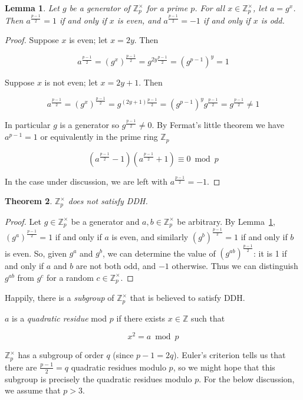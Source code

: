 \documentclass[11pt,twoside,a4paper]{article}
\newtheorem{theorem}{Theorem}[section]
\newtheorem{lemma}[theorem]{Lemma}
\theoremstyle{definition}
\begin{document}
\begin{lemma}\label{lem-parity}
    Let $g$ be a generator of $\mathbb{Z}^\times_p$ for a prime $p$. For all $x\in\mathbb{Z}^\times_p$, let $a=g^x$. Then $a^{\frac{p-1}{2}} = 1$ if and only if $x$ is even, and $a^{\frac{p-1}{2}} = -1$ if and only if $x$ is odd.
\end{lemma}
\begin{proof}
    Suppose $x$ is even; let $x=2y$. Then

    $$a^{\frac{p-1}{2}}=(g^x)^{\frac{p-1}{2}}=g^{2y\frac{p-1}{2}}=(g^{p-1})^y=1$$

    Suppose $x$ is not even; let $x=2y+1$. Then

    $$a^{\frac{p-1}{2}}=(g^x)^{\frac{p-1}{2}}=g^{(2y+1)\frac{p-1}{2}}=(g^{p-1})^yg^{\frac{p-1}{2}}=g^{\frac{p-1}{2}}\neq 1$$

    In particular $g$ is a generator so $g^\frac{p-1}{2}\neq 0$. By Fermat's little theorem we have $a^{p-1}=1$ or equivalently in the prime ring $\mathbb{Z}_p$

    $$\left(a^\frac{p-1}{2}-1\right)\left(a^\frac{p-1}{2}+1\right)\equiv 0\bmod p$$
    
    In the case under discussion, we are left with $a^\frac{p-1}{2}=-1$.
\end{proof}
\begin{theorem}
    $\mathbb{Z}^\times_p$ does not satisfy DDH.
\end{theorem}
\begin{proof}
    Let $g\in\mathbb{Z}^\times_p$ be a generator and $a,b\in\mathbb{Z}^\times_p$ be arbitrary. By Lemma~\ref{lem-parity}, $(g^a)^{\frac{p-1}{2}}=1$ if and only if $a$ is even, and similarly $(g^b)^{\frac{p-1}{2}}=1$ if and only if $b$ is even. So, given $g^a$ and $g^b$, we can determine the value of $\left(g^{ab}\right)^\frac{p-1}{2}$: it is 1 if and only if $a$ and $b$ are not both odd, and $-1$ otherwise. Thus we can distinguish $g^{ab}$ from $g^c$ for a random $c\in\mathbb{Z}^\times_p$.
\end{proof}
Happily, there is a \textit{subgroup} of $\mathbb{Z}^\times_p$ that is believed to satisfy DDH.
\begin{definition}
    $a$ is a \textit{quadratic residue} mod $p$ if there exists $x\in\mathbb{Z}$ such that

    $$x^2=a\bmod p$$

\end{definition}
$\mathbb{Z}^\times_p$ has a subgroup of order $q$ (since $p-1=2q$). Euler's criterion tells us that there are $\frac{p-1}{2}=q$ quadratic residues modulo $p$, so we might hope that this subgroup is precisely the quadratic residues modulo $p$. For the below discussion, we assume that $p>3$.
\end{document}
